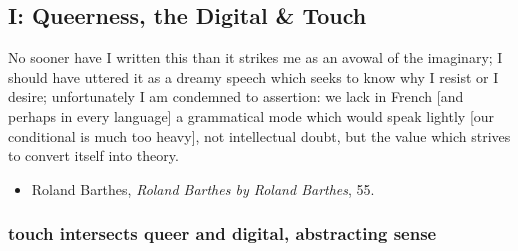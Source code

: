 \documentclass[11pt]{article}
\begin{document}
\subsection{I: Queerness, the Digital \& Touch}
\label{sec:orge028f99}
No sooner have I written this than it strikes me as an avowal of the
imaginary; I should have uttered it as a dreamy speech which seeks to
know why I resist or I desire; unfortunately I am condemned to
assertion: we lack in French [and perhaps in every language] a
grammatical mode which would speak lightly [our conditional is much
too heavy], not intellectual doubt, but the value which strives to
convert itself into theory.
\begin{itemize}
\item Roland Barthes, \emph{Roland Barthes by Roland Barthes}, 55.
\end{itemize}

\subsubsection{touch intersects queer and digital, abstracting sense}
\label{sec:org14a136c}
\end{document}

